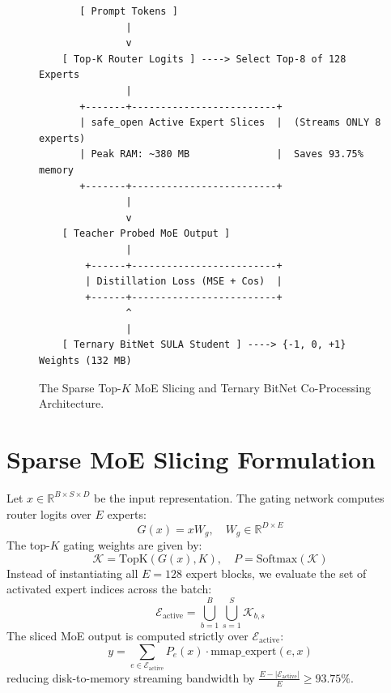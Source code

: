 \documentclass[11pt,a4paper]{article}
\begin{document}
\begin{figure}[h]
\centering
\begin{verbatim}
       [ Prompt Tokens ]
               |
               v
    [ Top-K Router Logits ] ----> Select Top-8 of 128 Experts
               |
       +-------+-------------------------+
       | safe_open Active Expert Slices  |  (Streams ONLY 8 experts)
       | Peak RAM: ~380 MB               |  Saves 93.75% memory
       +-------+-------------------------+
               |
               v
    [ Teacher Probed MoE Output ]
               |
        +------+-------------------------+
        | Distillation Loss (MSE + Cos)  |
        +------+-------------------------+
               ^
               |
    [ Ternary BitNet SULA Student ] ----> {-1, 0, +1} Weights (132 MB)
\end{verbatim}
\caption{The Sparse Top-$K$ MoE Slicing and Ternary BitNet Co-Processing Architecture.}
\label{fig:moe_ternary_arch}
\end{figure}

\section{Sparse MoE Slicing Formulation}
Let $x \in \mathbb{R}^{B \times S \times D}$ be the input representation. The gating network computes router logits over $E$ experts:
\begin{equation}
G(x) = x W_g, \quad W_g \in \mathbb{R}^{D \times E}
\end{equation}
The top-$K$ gating weights are given by:
\begin{equation}
\mathcal{K} = \text{TopK}(G(x), K), \quad P = \text{Softmax}(\mathcal{K})
\end{equation}
Instead of instantiating all $E=128$ expert blocks, we evaluate the set of activated expert indices across the batch:
\begin{equation}
\mathcal{E}_{\text{active}} = \bigcup_{b=1}^{B} \bigcup_{s=1}^{S} \mathcal{K}_{b,s}
\end{equation}
The sliced MoE output is computed strictly over $\mathcal{E}_{\text{active}}$:
\begin{equation}
y = \sum_{e \in \mathcal{E}_{\text{active}}} P_{e}(x) \cdot \text{mmap\_expert}(e, x)
\end{equation}
reducing disk-to-memory streaming bandwidth by $\frac{E - |\mathcal{E}_{\text{active}}|}{E} \ge 93.75\%$.
\end{document}

